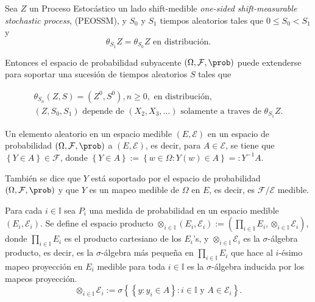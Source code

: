 \begin{Teo}
Sea $Z$ un Proceso Estoc\'astico un lado shift-medible \textit{one-sided shift-measurable stochastic process}, (PEOSSM),
y $S_{0}$ y $S_{1}$ tiempos aleatorios tales que $0\leq S_{0}<S_{1}$ y
\begin{equation}
\theta_{S_{1}}Z=\theta_{S_{0}}Z\textrm{ en distribuci\'on}.
\end{equation}

Entonces el espacio de probabilidad subyacente $\left(\Omega,\mathcal{F},\prob\right)$ puede extenderse para soportar una sucesi\'on de tiempos aleatorios $S$ tales que

\begin{eqnarray}
\theta_{S_{n}}\left(Z,S\right)=\left(Z^{0},S^{0}\right),n\geq0,\textrm{ en distribuci\'on},\\
\left(Z,S_{0},S_{1}\right)\textrm{ depende de }\left(X_{2},X_{3},\ldots\right)\textrm{ solamente a traves de }\theta_{S_{1}}Z.
\end{eqnarray}
\end{Teo}

\begin{Def}
Un elemento aleatorio en un espacio medible $\left(E,\mathcal{E}\right)$ en un espacio de probabilidad $\left(\Omega,\mathcal{F},\prob\right)$ a $\left(E,\mathcal{E}\right)$, es decir,
para $A\in \mathcal{E}$,  se tiene que $\left\{Y\in A\right\}\in\mathcal{F}$, donde $\left\{Y\in A\right\}:=\left\{w\in\Omega:Y\left(w\right)\in A\right\}=:Y^{-1}A$.
\end{Def}

\begin{Note}
Tambi\'en se dice que $Y$ est\'a soportado por el espacio de probabilidad $\left(\Omega,\mathcal{F},\prob\right)$ y que $Y$ es un mapeo medible de $\Omega$ en $E$, es decir, es $\mathcal{F}/\mathcal{E}$ medible.
\end{Note}

\begin{Def}
Para cada $i\in \mathbb{I}$ sea $P_{i}$ una medida de probabilidad en un espacio medible $\left(E_{i},\mathcal{E}_{i}\right)$. Se define el espacio producto
$\otimes_{i\in\mathbb{I}}\left(E_{i},\mathcal{E}_{i}\right):=\left(\prod_{i\in\mathbb{I}}E_{i},\otimes_{i\in\mathbb{I}}\mathcal{E}_{i}\right)$, donde $\prod_{i\in\mathbb{I}}E_{i}$ es el producto cartesiano de los $E_{i}$'s, y $\otimes_{i\in\mathbb{I}}\mathcal{E}_{i}$ es la $\sigma$-\'algebra producto, es decir, es la $\sigma$-\'algebra m\'as peque\~na en $\prod_{i\in\mathbb{I}}E_{i}$ que hace al $i$-\'esimo mapeo proyecci\'on en $E_{i}$ medible para toda $i\in\mathbb{I}$ es la $\sigma$-\'algebra inducida por los mapeos proyecci\'on. $$\otimes_{i\in\mathbb{I}}\mathcal{E}_{i}:=\sigma\left\{\left\{y:y_{i}\in A\right\}:i\in\mathbb{I}\textrm{ y }A\in\mathcal{E}_{i}\right\}.$$
\end{Def}

